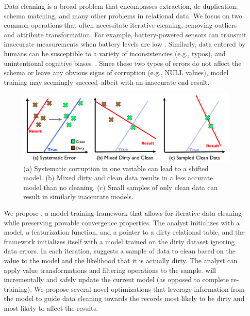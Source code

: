 Data cleaning is a broad problem that encompasses extraction, de-duplication, schema matching, and many other problems in relational data.
We focus on two common operations that often necessitate iterative cleaning, removing outliers and attribute transformation.
For example, battery-powered sensors can transmit inaccurate measurements when battery levels are low \cite{DBLP:conf/pervasive/JefferyAFHW06}. 
Similarly, data entered by humans can be susceptible to a variety of inconsistencies (e.g., typos), and unintentional cognitive biases~\cite{DBLP:conf/recsys/KrishnanPFG14}.
Since these two types of errors do not affect the schema or leave any obvious signs of corruption (e.g., NULL values), model training may seemingly succeed--albeit with an inaccurate end result.

\begin{figure}[t]
\centering
 \includegraphics[width=\columnwidth]{figs/update-arch.png}
 \caption{(a) Systematic corruption in one variable can lead to a shifted model. 
 (b) Mixed dirty and clean data results in a less accurate model than no cleaning.
(c) Small samples of only clean data can result in similarly inaccurate models. \label{update-arch1}}
\vspace{-2em}
\end{figure}

We propose \sys, a model training framework that allows for iterative data cleaning while preserving provable convergence properties.
The analyst initializes \sys with a model, a featurization function, and a pointer to a dirty relational table, and the framework initializes itself with a model trained on the dirty dataset ignoring data errors.
In each iteration, \sys suggests a sample of data to clean based on the value to the model and the likelihood that it is actually dirty.
The analyst can apply value transformations and filtering operations to the sample. 
\sys will incrementally and safely update the current model (as opposed to complete re-training).
We propose several novel optimizations that leverage information from the model to guide data cleaning towards the records most likely to be dirty and most likely to affect the results.

